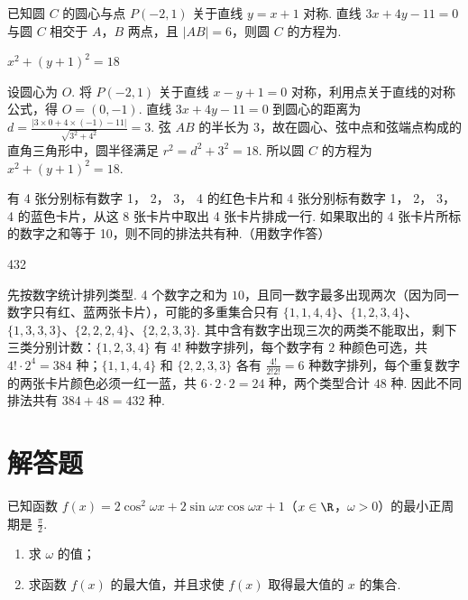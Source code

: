 \begin{problem}
已知圆 \(C\) 的圆心与点 \(P(-2,1)\) 关于直线 \(y = x + 1\) 对称. 直线 \(3x + 4y - 11 = 0\) 与圆 \(C\) 相交于 \(A\)，\(B\) 两点，且 \(|AB| = 6\)，则圆 \(C\) 的方程为\fillinblank{}.
\end{problem}

\begin{answer}
\(x^2 + (y + 1)^2 = 18\)
\end{answer}

\begin{solution}
设圆心为 \(O\). 将 \(P(-2,1)\) 关于直线 \(x-y+1=0\) 对称，利用点关于直线的对称公式，得 \(O=(0,-1)\). 直线 \(3x+4y-11=0\) 到圆心的距离为 \(d=\frac{|3\times0+4\times(-1)-11|}{\sqrt{3^2+4^2}}=3\). 弦 \(AB\) 的半长为 \(3\)，故在圆心、弦中点和弦端点构成的直角三角形中，圆半径满足 \(r^2=d^2+3^2=18\). 所以圆 \(C\) 的方程为 \(x^2+(y+1)^2=18\).
\end{solution}

\begin{problem}
有 4 张分别标有数字 1， 2， 3， 4 的红色卡片和 4 张分别标有数字 1， 2， 3， 4 的蓝色卡片，从这 8 张卡片中取出 4 张卡片排成一行. 如果取出的 4 张卡片所标的数字之和等于 10，则不同的排法共有\fillinblank{}种.（用数字作答）
\end{problem}

\begin{answer}
432
\end{answer}

\begin{solution}
先按数字统计排列类型. 4 个数字之和为 \(10\)，且同一数字最多出现两次（因为同一数字只有红、蓝两张卡片），可能的多重集合只有
\(\{1,1,4,4\}\)、\(\{1,2,3,4\}\)、\(\{1,3,3,3\}\)、\(\{2,2,2,4\}\)、\(\{2,2,3,3\}\). 其中含有数字出现三次的两类不能取出，剩下三类分别计数：\(\{1,2,3,4\}\) 有 \(4!\) 种数字排列，每个数字有 \(2\) 种颜色可选，共 \(4!\cdot2^4=384\) 种；\(\{1,1,4,4\}\) 和 \(\{2,2,3,3\}\) 各有 \(\frac{4!}{2!2!}=6\) 种数字排列，每个重复数字的两张卡片颜色必须一红一蓝，共 \(6\cdot2\cdot2=24\) 种，两个类型合计 \(48\) 种. 因此不同排法共有 \(384+48=432\) 种.
\end{solution}

\section{解答题}

\begin{problem}
已知函数 \( f(x) = 2\cos^{2}\omega x + 2\sin\omega x\cos \omega x + 1 \)（\(x \in \R\)，\(\omega > 0\)）的最小正周期是 \(\frac{\pi}{2}\).
\begin{enumerate}
\item 求 \( \omega \) 的值；
\item 求函数 \( f(x) \) 的最大值，并且求使 \( f(x) \) 取得最大值的 \( x \) 的集合.
\end{enumerate}
\end{problem}

